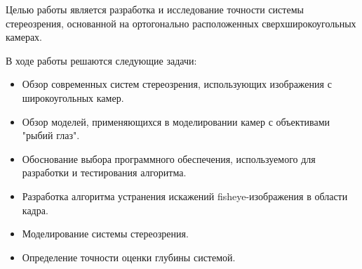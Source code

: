 Целью работы является разработка и исследование точности системы стереозрения, основанной на ортогонально расположенных сверхширокоугольных камерах.

В ходе работы решаются следующие задачи:
\begin{itemize}     %
    \item Обзор современных систем стереозрения, использующих изображения с широкоугольных камер.
    \item Обзор моделей, применяющихся в моделировании камер с объективами "рыбий глаз".
    \item Обоснование выбора программного обеспечения, используемого для разработки и тестирования алгоритма. 
    \item Разработка алгоритма устранения искажений fisheye-изображения в  области кадра. %
    \item Моделирование системы  стереозрения.                                    
    \item Определение точности оценки глубины системой.  
\end{itemize}


\clearpage